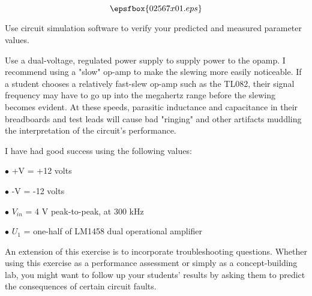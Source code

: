 

$$\epsfbox{02567x01.eps}$$

\vfil \eject






Use circuit simulation software to verify your predicted and measured parameter values.







Use a dual-voltage, regulated power supply to supply power to the opamp. I recommend using a "slow" op-amp to make the slewing more easily noticeable.  If a student chooses a relatively fast-slew op-amp such as the TL082, their signal frequency may have to go up into the megahertz range before the slewing becomes evident.  At these speeds, parasitic inductance and capacitance in their breadboards and test leads will cause bad "ringing" and other artifacts muddling the interpretation of the circuit's performance.

I have had good success using the following values:

\medskip
\item{$\bullet$} +V = +12 volts
\item{$\bullet$} -V = -12 volts
\item{$\bullet$} $V_{in}$ = 4 V peak-to-peak, at 300 kHz
\item{$\bullet$} $U_1$ = one-half of LM1458 dual operational amplifier
\medskip

An extension of this exercise is to incorporate troubleshooting questions.  Whether using this exercise as a performance assessment or simply as a concept-building lab, you might want to follow up your students' results by asking them to predict the consequences of certain circuit faults.




